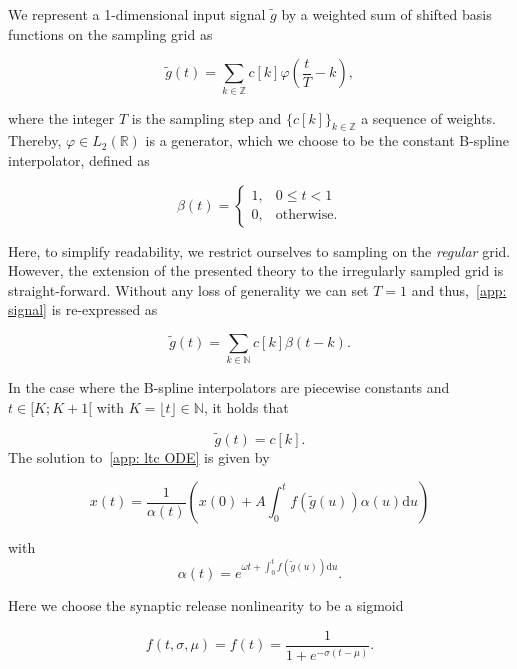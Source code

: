 \documentclass{article}
\begin{document}
We represent a 1-dimensional input signal $\tilde{g}$ by a weighted sum of shifted basis functions on the sampling grid as

\begin{equation}\label{app: signal}
\tilde{g}(t)=\sum_{k\in\mathbb{Z}}c[k]\varphi(\frac{t}{T}-k),
\end{equation}

where the integer $T$ is the sampling step and $\{c[k]\}_{k\in\mathbb{Z}}$ a sequence of weights. Thereby, $\varphi\in L_2(\mathbb{R})$ is a generator, which we choose to be the constant B-spline interpolator, defined as

\begin{equation}
    \beta(t) = \begin{cases}
    1, & 0 \leq t < 1 \\
    0, & \text{otherwise.}
\end{cases}
\end{equation}

\noindent Here, to simplify readability, we restrict ourselves to sampling on the \textit{regular} grid. However, the extension of the presented theory to the irregularly sampled grid is straight-forward. Without any loss of generality we can set $T=1$ and thus,~\eqref{app: signal} is re-expressed as 

\begin{equation}\label{app: spline signal}
\tilde{g}(t)=\sum_{k\in\mathbb N} c[k]\beta(t-k).
\end{equation}

\noindent In the case where the B-spline interpolators are piecewise constants and $t \in [K; K+1[$ with $K=\lfloor t \rfloor\in\mathbb{N} $, it holds that 

\begin{equation}\label{app: spline signal constants}
\tilde{g}(t)=c[k].
\end{equation}
\noindent The solution to~\eqref{app: ltc ODE} is given by

\begin{equation}\label{app: exact solution 1 synapse}
    x(t)=\frac{1}{\alpha(t)}\left(x(0)+A\int_0^t f(\tilde{g}(u)) \alpha(u)\mathrm{d}u \right)
\end{equation}

\noindent with
$$
\alpha(t) = e^{\omega t+\int_0^tf(\tilde{g}(u))\mathrm{d}u}.
$$

\noindent Here we choose the synaptic release nonlinearity to be a sigmoid

\begin{equation}\label{app: sigmoid}
f(t,\sigma, \mu) = f(t) = \frac{1}{1 + e^{-\sigma (t - \mu)}}.
\end{equation}
\end{document}
